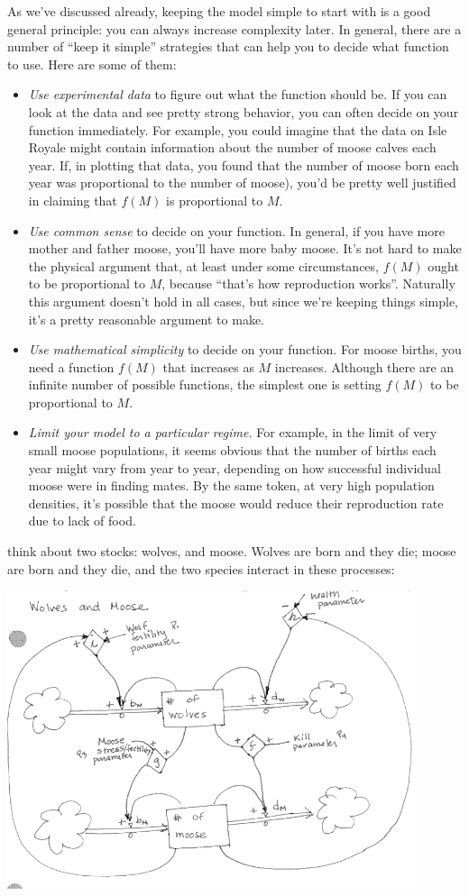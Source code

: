 \documentclass{tufte-handout}
\begin{document}
As we've discussed already, keeping the model simple to start with is a good general principle: you can always increase complexity later.  In general, there are a number of ``keep it simple'' strategies that can help you to decide what function to use.  Here are some of them:
\begin{itemize}
\item {\em Use experimental data} to figure out what the function should be.  If you can look at the data and see pretty strong behavior, you can often decide on your function immediately.  For example, you could imagine that the data on Isle Royale might contain information about the number of moose calves each year.  If, in plotting that data, you found that  the number of moose born each year was proportional to the number of moose), you'd be pretty well justified in claiming that $f(M)$ is proportional to $M$.
\item {\em Use common sense} to decide on your function.  In general, if you have more mother and father moose, you'll have more baby moose.  It's not hard to make the physical argument that, at least under some circumstances, $f(M)$ ought to be proportional to $M$, because ``that's how reproduction works''.   Naturally this argument doesn't hold in all cases, but since we're keeping things simple, it's a pretty reasonable argument to make.
\item {\em Use mathematical simplicity} to decide on your function.  For moose births, you need a function $f(M)$ that increases as $M$ increases.  Although there are an infinite number of possible functions, the simplest one is setting $f(M)$ to be proportional to $M$.
\item {\em Limit your model to a particular regime.}  For example, in the limit of very small moose populations, it seems obvious that the number of births each year might vary from year to year, depending on how successful individual moose were in finding mates.  By the same token, at very high population densities, it's possible that the moose would reduce their reproduction rate due to lack of food.  


\end{itemize}
think about two stocks:  wolves, and moose.  Wolves are born and they die; moose are born and they die, and the two species interact in these processes:

\includegraphics[width=12cm]{figs/WolfMooseStockAndFlow}
\end{document}
